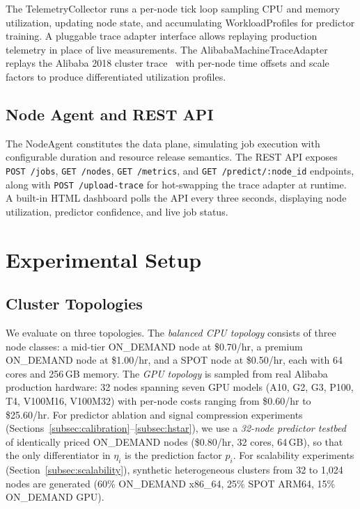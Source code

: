 \documentclass[conference]{IEEEtran}
\begin{document}
The TelemetryCollector runs a per-node tick loop sampling CPU and memory
utilization, updating node state, and accumulating WorkloadProfiles for
predictor training. A pluggable trace adapter interface allows replaying
production telemetry in place of live measurements. The
AlibabaMachineTraceAdapter replays the Alibaba 2018 cluster
trace~\cite{alibaba2018trace} with per-node time offsets and scale factors
to produce differentiated utilization profiles.

\subsection{Node Agent and REST API}

The NodeAgent constitutes the data plane, simulating job execution with
configurable duration and resource release semantics. The REST API exposes
\texttt{POST /jobs}, \texttt{GET /nodes}, \texttt{GET /metrics}, and
\texttt{GET /predict/:node\_id} endpoints, along with
\texttt{POST /upload-trace} for hot-swapping the trace adapter at runtime.
A built-in HTML dashboard polls the API every three seconds, displaying
node utilization, predictor confidence, and live job status.


\section{Experimental Setup}

\subsection{Cluster Topologies}

We evaluate on three topologies. The \emph{balanced CPU topology} consists
of three node classes: a mid-tier ON\_DEMAND node at \$0.70/hr, a premium
ON\_DEMAND node at \$1.00/hr, and a SPOT node at \$0.50/hr, each with
64 cores and 256\,GB memory. The \emph{GPU topology} is sampled from real
Alibaba production hardware: 32 nodes spanning seven GPU models (A10, G2,
G3, P100, T4, V100M16, V100M32) with per-node costs ranging from
\$0.60/hr to \$25.60/hr. For predictor ablation and signal compression
experiments (Sections~\ref{subsec:calibration}--\ref{subsec:hstar}), we
use a \emph{32-node predictor testbed} of identically priced ON\_DEMAND
nodes (\$0.80/hr, 32 cores, 64\,GB), so that the only differentiator in
$\eta_i$ is the prediction factor $p_i$. For scalability experiments
(Section~\ref{subsec:scalability}), synthetic heterogeneous clusters from
32 to 1{,}024 nodes are generated (60\% ON\_DEMAND x86\_64, 25\% SPOT
ARM64, 15\% ON\_DEMAND GPU).
\end{document}
